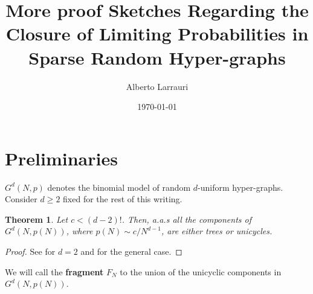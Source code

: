 \documentclass[11pt,notitlepage,a4paper]{article}
\title{More proof Sketches Regarding the Closure of 
	Limiting Probabilities in Sparse Random Hyper-graphs}
\date{\today}
\author{Alberto Larrauri}
\newtheorem{theorem}{Theorem}[section]
\theoremstyle{definition}
\begin{document}
	\maketitle 
\section{Preliminaries}
$G^d(N,p)$ denotes the binomial model of random $d$-uniform hyper-graphs. 
Consider $d\geq 2$ fixed for the rest of this writing. 

\begin{theorem} Let $c<(d-2)!$. Then, a.a.s all the components
of $G^d(N,p(N))$, where $p(N)\sim c/N^{d-1}$, are either trees or unicycles.
\end{theorem}
\begin{proof} See \cite{erdHos1960evolution} for $d=2$ and
	\cite{karonski2002phase} for the general case.
\end{proof}
We will call the \textbf{fragment} $F_N$ to the union of the unicyclic 
components in $G^d(N,p(N))$.
\end{document}
